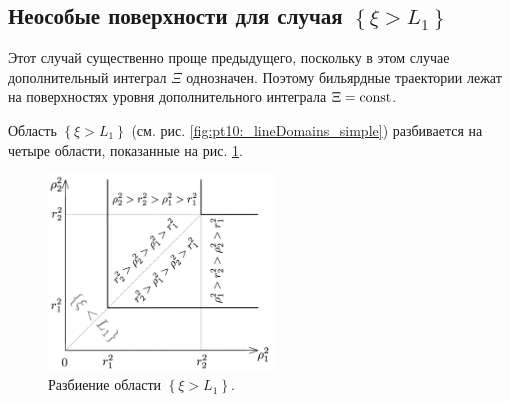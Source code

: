 \subsection{Неособые поверхности для случая $\left\{\xi > L_1\right\}$}\label{sec:ch4/sec3/subsec9}
Этот случай существенно проще предыдущего, поскольку в этом случае дополнительный интеграл $\Xi$ однозначен. Поэтому бильярдные траектории лежат на поверхностях уровня дополнительного интеграла $\Xi=\mathrm{const}$.

Область $\left\{\xi > L_1 \right\}$ (см. рис. \ref{fig:pt10:_lineDomains_simple}) разбивается  на четыре области, показанные на рис. \ref{fig:pt10:_xiL1_subdivision}.
\begin{figure}[!htb]
\centering
\includegraphics[width=6cm]{images/ch4/section3_circular/sect3_xiL1_subdivision.pdf}
    \caption{Разбиение области $\left\{\xi > L_1\right\}$.}
    \label{fig:pt10:_xiL1_subdivision}
\end{figure}

